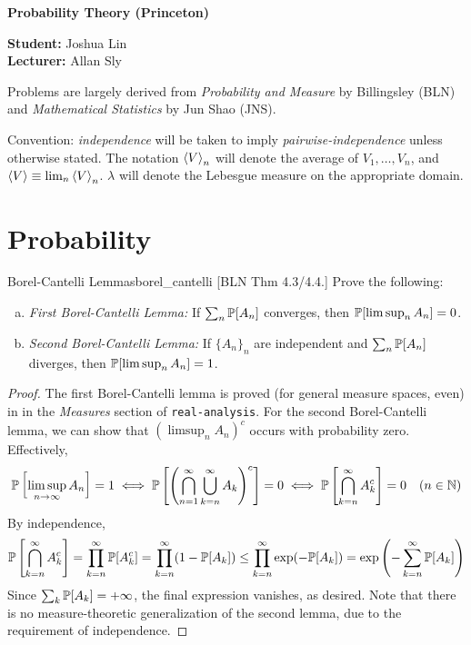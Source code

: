 





\begin{Large}
    \textsf{\textbf{Probability Theory (Princeton)}}
\end{Large}

\vspace{1ex}

\textsf{\textbf{Student:}} Joshua Lin \\
\textsf{\textbf{Lecturer:}} Allan Sly

\vspace{2ex}

Problems are largely derived from \textit{Probability and Measure} by Billingsley (BLN) and \textit{Mathematical Statistics} by Jun Shao (JNS).
\stdvspace

Convention: \textit{independence} will be taken to imply \textit{pairwise-independence} unless otherwise stated. The notation \(\ev{V}_n\) will denote the average of \(V_1, \dots, V_n\), and \(\ev{V} \equiv \lim_n \ev{V}_n\). \(\lambda\) will denote the Lebesgue measure on the appropriate domain.

\section{Probability}


\begin{problem}{Borel-Cantelli Lemmas}{borel_cantelli}
    [BLN Thm 4.3/4.4.] Prove the following:
    \begin{enumerate}[(a)]
        \itemsep0em
        \item \textit{First Borel-Cantelli Lemma:} If \(\sum_n \mathbb{P}[A_n]\) converges, then \(\mathbb{P}[\limsup_n A_n] = 0\).
        \item \textit{Second Borel-Cantelli Lemma:} If \(\{A_n\}_n\) are independent and \(\sum_n \mathbb{P}[A_n]\) diverges, then \(\mathbb{P}[\limsup_n A_n] = 1\).
    \end{enumerate}
\end{problem}


\begin{proof}
    The first Borel-Cantelli lemma is proved (for general measure spaces, even) in in the \textit{Measures} section of \texttt{real-analysis}. For the second Borel-Cantelli lemma, we can show that \((\limsup_n A_n)^c\) occurs with probability zero. Effectively,
    \[
        \mathbb{P}\left[\limsup_{n \to \infty} A_n\right] = 1
        \iff \mathbb{P}\left[ \left(\bigcap_{n=1}^\infty \bigcup_{k=n}^\infty A_k\right)^c \right] = 0
        \iff \mathbb{P}\left[ \bigcap_{k=n}^\infty A_k^c \right] = 0
        \quad (n \in \mathbb{N})
    \]
    By independence,
    \[
        \mathbb{P}\left[ \bigcap_{k =n}^\infty A_k^c \right]
        = \prod_{k=n}^\infty \mathbb{P}[A_k^c]
        = \prod_{k=n}^\infty (1 - \mathbb{P}[A_k])
        \leq \prod_{k=n}^\infty \exp(-\mathbb{P}[A_k])
        = \exp\left( -\sum_{k=n}^\infty \mathbb{P}[A_k] \right)
    \]
    Since \(\sum_k \mathbb{P}[A_k] = +\infty\), the final expression vanishes, as desired. Note that there is no measure-theoretic generalization of the second lemma, due to the requirement of independence.
\end{proof}


